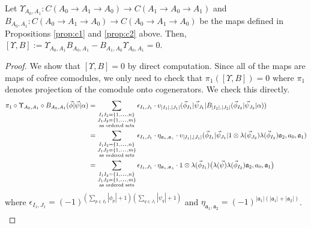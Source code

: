 \begin{prop}
\label{prop:c3}
Let $\Upsilon_{A_0,A_1}: 
C(A_0 \to A_1 \to A_0) \longrightarrow
C(A_1 \to A_0 \to A_1)$ and 
$B_{A_0,A_1}:C(A_0 \to A_1 \to A_0) 
\longrightarrow C(A_0 \to A_1 \to A_0)$ 
be the maps defined in Propositions 
\ref{prop:c1} and \ref{prop:c2} above. 
Then, $[\Upsilon, B] := 
\Upsilon_{A_0,A_1} B_{A_0,A_1} - 
B_{A_1,A_0}\Upsilon_{A_0,A_1} = 0$.
\end{prop}
%
\begin{proof}
We show that $[\Upsilon, B] = 0$ by direct 
computation. Since all of the maps are maps 
of cofree comodules, we only need to check 
that $\pi_1([\Upsilon, B]) = 0$ where 
$\pi_1$ denotes projection of the comodule 
onto cogenerators. We check this directly.
%
\begin{equation*}
\begin{aligned}
\pi_1 \circ \Upsilon_{A_0,A_1} \circ B_{A_0,A_1} 
  (\vec{\phi} | \vec{\psi} | \alpha ) 
&= 
\sum \limits_{\substack{
  I_1I_2 = \{1,\smdots,n\}\\
  J_1J_2 = \{1,\smdots,m\}\\
  \textrm{as ordered sets}}}
\epsilon_{I_1,J_1} \cdot
  \upsilon_{|I_1|, |J_1|} (\vec{\phi}_{I_1} | \vec{\psi}_{J_1} | 
    B_{|I_2|, |J_2|} (\vec{\phi}_{I_2} | \vec{\psi}_{J_2} | \alpha)) \\
&= 
\sum \limits_{\substack{
  I_1I_2 = \{1,\smdots,n\}\\
  J_1J_2 = \{1,\smdots,m\}\\
  \textrm{as ordered sets}}}
\epsilon_{I_1,J_1} \cdot 
\eta_{\mathfrak{a_1},\mathfrak{a_2}} \cdot
\upsilon_{|I_1|, |J_1|} (\vec{\phi}_{I_1} | \vec{\psi}_{J_1} | 
  1 \otimes \lambda(\vec{\psi}_{J_2}) \lambda(\vec{\phi}_{I_2}) 
  \mathfrak{a}_2, a_0, \mathfrak{a}_1) \\
&= 
\sum \limits_{\substack{
  I_1I_2 = \{1,\smdots,n\}\\
  J_1J_2 = \{1,\smdots,m\}\\
  \textrm{as ordered sets}}}
\epsilon_{I_1,J_1} \cdot 
\eta_{\mathfrak{a_1},\mathfrak{a_2}} \cdot
1 \otimes \lambda(\vec{\phi}_{I_1}) \big( 
  \lambda(\vec{\psi}) \lambda(\vec{\phi}_{I_2}) 
  \mathfrak{a}_2, a_0, \mathfrak{a}_1 \big)
\end{aligned}
\end{equation*}
where $\epsilon_{I_1,J_1} = 
(-1)^{(\sum \limits_{p\in I_2}|\phi_p|+1)
(\sum \limits_{q \in J_1}|\psi_q|+1)}$ and 
$\eta_{\mathfrak{a_1},\mathfrak{a_2}} = 
(-1)^{|\mathfrak{a}_1|(|\mathfrak{a}_1|+|\mathfrak{a}_2|)}$.
%
\begin{align*}

\end{align*}
\end{proof}
